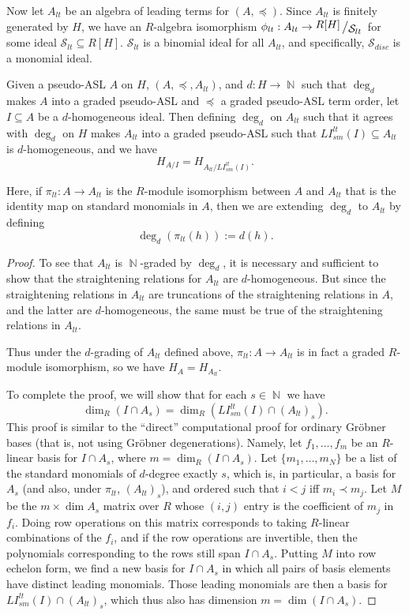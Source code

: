 \documentclass[11pt,reqno]{amsart}
\DeclareMathOperator{\N}{\mathbb{N}}
\newcommand{\bigslant}[2]{{\raisebox{.2em}{$#1$}\left/\raisebox{-.2em}{$#2$}\right.}}
\newcommand{\lismlt}{LI_{sm}^{lt}}
\theoremstyle{definition}
\numberwithin{equation}{section}
\begin{document}
Now let $A_{lt}$ be an algebra of leading terms for $(A,\preceq)$. Since $A_{lt}$ is finitely generated by $H$, we have an $R$-algebra isomorphism $\phi_{lt}: A_{lt} \rightarrow \bigslant{R[H]}{\mathcal{S}_{lt}}$ for some ideal $\mathcal{S}_{lt} \subseteq R[H]$. $\mathcal{S}_{lt}$ is a binomial ideal for all $A_{lt}$, and specifically, $\mathcal{S}_{disc}$ is a monomial ideal. 

\begin{theorem}[store=thmhilbertaslalt] 
\label{thm:hilbert-asl-alt}
Given a pseudo-ASL $A$ on $H$, $(A,\preceq,A_{lt})$, and $d\colon H \to \N$ such that $\deg_d$ makes $A$ into a graded pseudo-ASL and $\preceq$ a graded pseudo-ASL term order, let $I \subseteq A$ be a $d$-homogeneous ideal. Then defining $\deg_d$ on $A_{lt}$ such that it agrees with $\deg_d$ on $H$ makes $A_{lt}$ into a graded pseudo-ASL such that $\lismlt(I) \subseteq A_{lt}$ is $d$-homogeneous, and we have
\[
H_{A / I} = H_{A_{lt} / \lismlt(I)}.
\]
\end{theorem}

Here, if $\pi_{lt} \colon A \to A_{lt}$ is the $R$-module isomorphism between $A$ and $A_{lt}$ that is the identity map on standard monomials in $A$, then we are extending $\deg_d$ to $A_{lt}$ by defining 
\[
\deg_d(\pi_{lt}(h)) := d(h).
\] 

\begin{proof}
To see that $A_{lt}$ is $\N$-graded by $\deg_d$, it is necessary and sufficient to show that the straightening relations for $A_{lt}$ are $d$-homogeneous. But since the straightening relations in $A_{lt}$ are truncations of the straightening relations in $A$, and the latter are $d$-homogeneous, the same must be true of the straightening relations in $A_{lt}$. 

Thus under the $d$-grading of $A_{lt}$ defined above, $\pi_{lt}: A \rightarrow A_{lt}$ is in fact a graded $R$-module isomorphism, so we have $H_A = H_{A_{lt}}$.

To complete the proof, we will show that for each $s \in \N$ we have 
\[
\dim_R (I \cap A_s) = \dim_R (\lismlt(I) \cap (A_{lt})_s).
\]
This proof is similar to the ``direct'' computational proof for ordinary Gröbner bases (that is, not using Gröbner degenerations). Namely, let $f_1,\dotsc,f_m$ be an $R$-linear basis for $I \cap A_s$, where $m = \dim_R (I \cap A_s)$. Let $\{m_1,\dotsc,m_N\}$ be a list of the standard monomials of $d$-degree exactly $s$, which is, in particular, a basis for $A_s$ (and also, under $\pi_{lt}$, $(A_{lt})_s$), and ordered such that $i < j$ iff $m_i \prec m_j$. Let $M$ be the $m \times \dim A_s$ matrix over $R$ whose $(i,j)$ entry is the coefficient of $m_j$ in $f_i$. Doing row operations on this matrix corresponds to taking $R$-linear combinations of the $f_i$, and if the row operations are invertible, then the polynomials corresponding to the rows still span $I \cap A_s$. Putting $M$ into row echelon form, we find a new basis for $I \cap A_s$ in which all pairs of basis elements have distinct leading monomials. Those leading monomials are then a basis for $\lismlt(I) \cap (A_{lt})_s$, which thus also has dimension $m = \dim (I \cap A_s)$. 
\end{proof}
\end{document}
